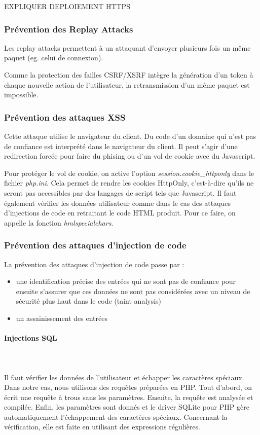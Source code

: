 \documentclass[a4paper]{article}
\begin{document}
EXPLIQUER DEPLOIEMENT HTTPS

\subsubsection{Prévention des \og Replay Attacks \fg}
Les replay attacks permettent à un attaquant d'envoyer plusieurs fois un
même paquet (eg. celui de connexion).

Comme la protection des failles CSRF/XSRF intègre la génération d'un
token à chaque nouvelle action de l'utilisateur, la retransmission d'un
même paquet est impossible.

\subsubsection{Prévention des attaques XSS}
 		
Cette attaque utilise le navigateur du client. Du code d'un domaine qui
n'est pas de confiance est interprété dans le navigateur du client.
Il peut s'agir d'une redirection forcée pour faire  du phising
ou d'un vol de cookie avec du Javascript.

Pour protéger le vol de cookie, on active l'option \textit{session.cookie\_httponly}
dans le fichier \textit{php.ini}. Cela permet de rendre les cookies HttpOnly,
c'est-à-dire qu'ils ne seront pas accessibles par des langages de script
tels que Javascript. Il faut également vérifier les données utilisateur
comme dans le cas des attaques d'injections de code en retraitant le code
HTML produit. Pour ce faire, on appelle la fonction \textit{hmlspecialchars}.
 		
\subsubsection{Prévention des attaques d'injection de code}
La prévention des attaques d'injection de code passe par :
\begin{itemize}
	\item une identification précise des entrées qui ne sont pas de
		confiance pour ensuite s'assurer que ces données ne sont pas
		considérées avec un niveau de sécurité plus haut dans le code
		(taint analysis) 
	\item un assainissement des entrées
\end{itemize}
		
\paragraph{Injections SQL}
~~\\
\\
Il faut vérifier les données de l'utilisateur et échapper les caractères spéciaux.
Dans notre cas, nous utilisons des requêtes préparées en PHP.
Tout d'abord, on écrit une requête à trous sans les paramètres. Ensuite, la
requête est analysée et compilée. Enfin, les paramètres sont donnés et le driver
SQLite pour PHP gère automatiquement l'échappement des caractères spéciaux.
Concernant la vérification, elle est faite en utilisant des expressions régulières.			
\end{document}
